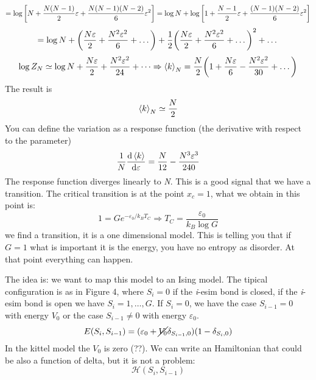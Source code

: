 \documentclass[../main/main.tex]{subfiles}
\begin{document}
\begin{equation}
  = \log{\qty[N + \frac{N(N-1)}{2}\varepsilon + \frac{N(N-1)(N-2)}{6}\varepsilon^2]  }
  = \log{N} + \log{\qty[1+\frac{N-1}{2}\varepsilon +\frac{(N-1)(N-2)}{6}\varepsilon ^2] }
\end{equation}
\begin{equation}
  = \log{N} + \qty( \frac{N \varepsilon }{2} + \frac{N^2 \varepsilon ^2}{6} + \dots) + \frac{1}{2} \qty(\frac{N \varepsilon }{2} + \frac{N^2 \varepsilon ^2}{6} + \dots)^2  + \dots
\end{equation}
\begin{equation}
  \log{Z_N} \simeq \log{N} + \frac{N \varepsilon }{2} + \frac{N^2 \varepsilon ^2}{24} + \dots \Rightarrow \expval{k}_N = \frac{N}{2} \qty( 1 + \frac{N \varepsilon }{6} - \frac{N^2 \varepsilon ^2}{30} + \dots)
\end{equation}
The result is
\begin{equation}
  \expval{k}_N \simeq \frac{N}{2}
\end{equation}
You can define the variation as a response function (the derivative with respect to the parameter)
\begin{equation}
  \frac{1}{N}\dv{\expval{k} }{\varepsilon } = \frac{N}{12} - \frac{N^3 \varepsilon ^3}{240}
\end{equation}
The response function diverges linearly to \emph{N}. This is a good signal that we have a transition. The critical transition is at the point \( x_c = 1 \), what we obtain in this point is:
\begin{equation}
  1 = G e^{-\varepsilon _0 /k_B T_C} \Rightarrow T_C = \frac{\varepsilon _0}{k_B \log{G} }
\end{equation}
we find a transition, it is a one dimensional model. This is telling you that if \( G=1 \) what is important it is the energy, you have no entropy as disorder.
At that point everything can happen.

The idea is: we want to map this model to an Ising model.
The tipical configuration is as in Figure 4, where \( S_i = 0 \) if the \emph{i}-esim bond is closed, if the \emph{i}-esim bond is open we have \( S_i = 1, \dots, G \).
If \( S_i = 0 \), we have the case \( S_{i-1} = 0 \)  with energy \( V_0 \) or the case  \( S_{i-1} \neq 0 \)  with energy \( \varepsilon _0 \).
\begin{equation}
  E ( S_i, S_{i-1}) = ( \varepsilon _0 + \cancel{ V_0} \delta _{S_{i-1},0}) (1- \delta _{S_i,0})
\end{equation}
In the kittel model the \( V_0 \) is zero (??).
We can write an Hamiltonian that could be also a function of delta, but it is not a problem:
\begin{equation}
  \mathcal{H} (S_i, S_{i-1})
\end{equation}
\end{document}
